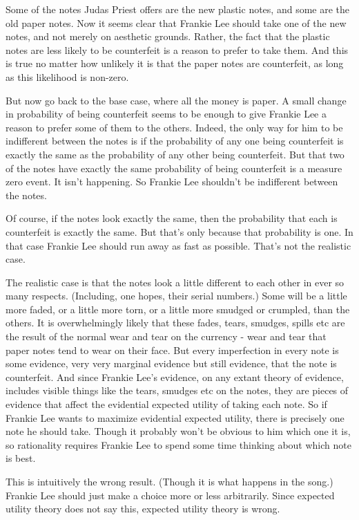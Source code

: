 \documentclass[
  11pt,
  letterpaper,
  DIV=11,
  numbers=noendperiod,
  twoside]{scrartcl}
\begin{document}
Some of the notes Judas Priest offers are the new plastic notes, and
some are the old paper notes. Now it seems clear that Frankie Lee should
take one of the new notes, and not merely on aesthetic grounds. Rather,
the fact that the plastic notes are less likely to be counterfeit is a
reason to prefer to take them. And this is true no matter how unlikely
it is that the paper notes are counterfeit, as long as this likelihood
is non-zero.

But now go back to the base case, where all the money is paper. A small
change in probability of being counterfeit seems to be enough to give
Frankie Lee a reason to prefer some of them to the others. Indeed, the
only way for him to be indifferent between the notes is if the
probability of any one being counterfeit is exactly the same as the
probability of any other being counterfeit. But that two of the notes
have exactly the same probability of being counterfeit is a measure zero
event. It isn't happening. So Frankie Lee shouldn't be indifferent
between the notes.

Of course, if the notes look exactly the same, then the probability that
each is counterfeit is exactly the same. But that's only because that
probability is one. In that case Frankie Lee should run away as fast as
possible. That's not the realistic case.

The realistic case is that the notes look a little different to each
other in ever so many respects. (Including, one hopes, their serial
numbers.) Some will be a little more faded, or a little more torn, or a
little more smudged or crumpled, than the others. It is overwhelmingly
likely that these fades, tears, smudges, spills etc are the result of
the normal wear and tear on the currency - wear and tear that paper
notes tend to wear on their face. But every imperfection in every note
is some evidence, very very marginal evidence but still evidence, that
the note is counterfeit. And since Frankie Lee's evidence, on any extant
theory of evidence, includes visible things like the tears, smudges etc
on the notes, they are pieces of evidence that affect the evidential
expected utility of taking each note. So if Frankie Lee wants to
maximize evidential expected utility, there is precisely one note he
should take. Though it probably won't be obvious to him which one it is,
so rationality requires Frankie Lee to spend some time thinking about
which note is best.

This is intuitively the wrong result. (Though it is what happens in the
song.) Frankie Lee should just make a choice more or less arbitrarily.
Since expected utility theory does not say this, expected utility theory
is wrong.
\end{document}
